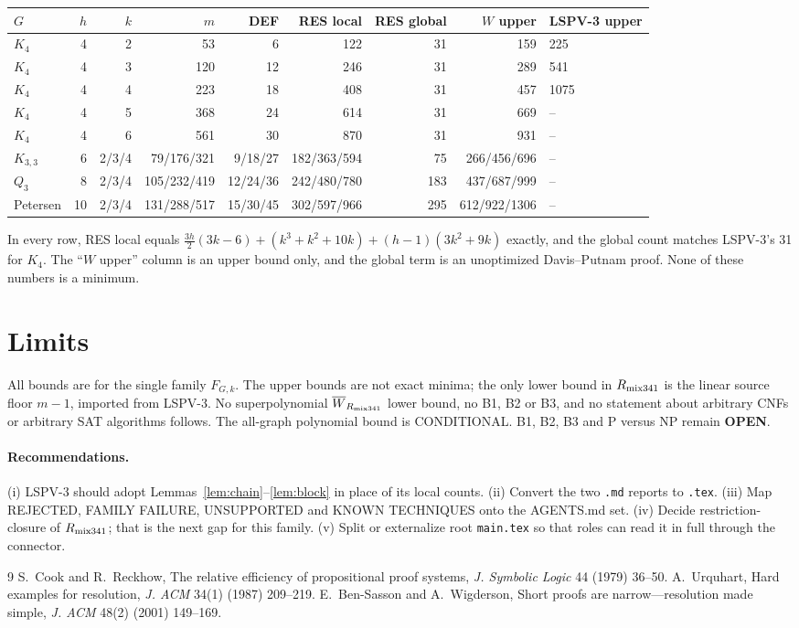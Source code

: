 \documentclass[11pt]{article}
\begin{document}
\begin{center}\small\setlength{\tabcolsep}{3pt}
\begin{tabular}{l|r|r|r|r|r|r|r|l}
$G$ & $h$ & $k$ & $m$ & DEF & RES local & RES global & $W$ upper & LSPV-3 upper\\\hline
$K_4$ & 4 & 2 & 53 & 6 & 122 & 31 & 159 & 225\\
$K_4$ & 4 & 3 & 120 & 12 & 246 & 31 & 289 & 541\\
$K_4$ & 4 & 4 & 223 & 18 & 408 & 31 & 457 & 1075\\
$K_4$ & 4 & 5 & 368 & 24 & 614 & 31 & 669 & --\\
$K_4$ & 4 & 6 & 561 & 30 & 870 & 31 & 931 & --\\
$K_{3,3}$ & 6 & 2/3/4 & 79/176/321 & 9/18/27 & 182/363/594 & 75 & 266/456/696 & --\\
$Q_3$ & 8 & 2/3/4 & 105/232/419 & 12/24/36 & 242/480/780 & 183 & 437/687/999 & --\\
Petersen & 10 & 2/3/4 & 131/288/517 & 15/30/45 & 302/597/966 & 295 & 612/922/1306 & --
\end{tabular}
\end{center}
In every row, RES local equals $\frac{3h}{2}(3k-6)+(k^3+k^2+10k)+(h-1)(3k^2+9k)$ exactly, and the global count matches LSPV-3's 31 for $K_4$. The ``$W$ upper'' column is an upper bound only, and the global term is an unoptimized Davis--Putnam proof. None of these numbers is a minimum.

\section{Limits}
All bounds are for the single family $F_{G,k}$. The upper bounds are not exact minima; the only lower bound in $R_{\rm mix341}$ is the linear source floor $m-1$, imported from LSPV-3. No superpolynomial $\overline W_{R_{\rm mix341}}$ lower bound, no B1, B2 or B3, and no statement about arbitrary CNFs or arbitrary SAT algorithms follows. The all-graph polynomial bound is CONDITIONAL. B1, B2, B3 and P versus NP remain \textbf{OPEN}.

\paragraph{Recommendations.} (i) LSPV-3 should adopt Lemmas~\ref{lem:chain}--\ref{lem:block} in place of its local counts. (ii) Convert the two \texttt{.md} reports to \texttt{.tex}. (iii) Map REJECTED, FAMILY FAILURE, UNSUPPORTED and KNOWN TECHNIQUES onto the AGENTS.md set. (iv) Decide restriction-closure of $R_{\rm mix341}$; that is the next gap for this family. (v) Split or externalize root \texttt{main.tex} so that roles can read it in full through the connector.

\begin{thebibliography}{9}
 S.~Cook and R.~Reckhow, The relative efficiency of propositional proof systems, \emph{J. Symbolic Logic} 44 (1979) 36--50.
 A.~Urquhart, Hard examples for resolution, \emph{J. ACM} 34(1) (1987) 209--219.
 E.~Ben-Sasson and A.~Wigderson, Short proofs are narrow---resolution made simple, \emph{J. ACM} 48(2) (2001) 149--169.
\end{thebibliography}
\end{document}

